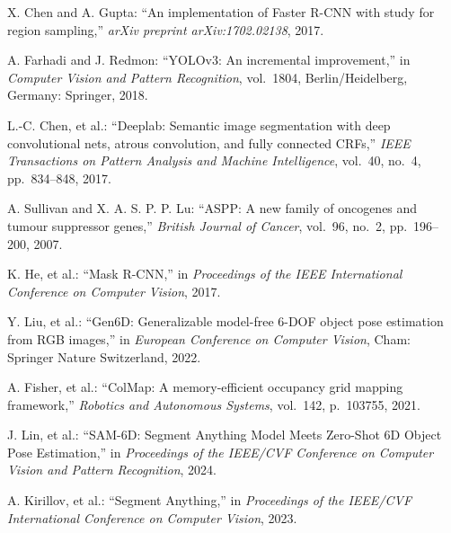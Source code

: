 \begin{thebibliography}{9}
	X. Chen and A. Gupta: 
			``An implementation of Faster R-CNN with study for region sampling,'' 
			{\it arXiv preprint arXiv:1702.02138}, 2017.

		A. Farhadi and J. Redmon: 
				``YOLOv3: An incremental improvement,'' 
				in {\it Computer Vision and Pattern Recognition}, vol.~1804, 
				Berlin/Heidelberg, Germany: Springer, 2018.
			
		L.-C. Chen, et al.: 
				``Deeplab: Semantic image segmentation with deep convolutional nets, atrous convolution, and fully connected CRFs,'' 
				{\it IEEE Transactions on Pattern Analysis and Machine Intelligence}, 
				vol.~40, no.~4, pp.~834--848, 2017.

		A. Sullivan and X. A. S. P. P. Lu: 
				``ASPP: A new family of oncogenes and tumour suppressor genes,'' 
				{\it British Journal of Cancer}, 
				vol.~96, no.~2, pp.~196--200, 2007.

		K. He, et al.: 
    		``Mask R-CNN,'' 
    		in {\it Proceedings of the IEEE International Conference on Computer Vision}, 2017.

		Y. Liu, et al.: 
    ``Gen6D: Generalizable model-free 6-DOF object pose estimation from RGB images,'' 
    in {\it European Conference on Computer Vision}, Cham: Springer Nature Switzerland, 2022.

		A. Fisher, et al.: 
				``ColMap: A memory-efficient occupancy grid mapping framework,'' 
				{\it Robotics and Autonomous Systems}, 
				vol.~142, p.~103755, 2021.
		
		J. Lin, et al.: 
				``SAM-6D: Segment Anything Model Meets Zero-Shot 6D Object Pose Estimation,'' 
				in {\it Proceedings of the IEEE/CVF Conference on Computer Vision and Pattern Recognition}, 2024.
				
		A. Kirillov, et al.: 
				``Segment Anything,'' 
				in {\it Proceedings of the IEEE/CVF International Conference on Computer Vision}, 2023.
				



\end{thebibliography}
